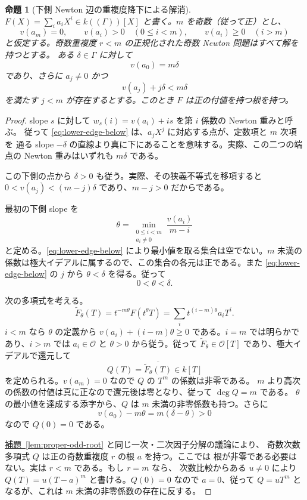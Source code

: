 \documentclass[11pt,uplatex,dvipdfmx]{jsarticle}
\newcommand{\Val}{v}
\newcommand{\Ocal}{\mathcal O}
\newcommand{\namedref}[2]{\hyperref[#2]{#1~\ref*{#2}}}
\theoremstyle{proofnote}
\newtheorem{proposition}[theorem]{命題}
\begin{document}
\begin{proposition}[下側 Newton 辺の重複度降下による解消]
\label{prop:lower-edge}
  \(F(X)=\sum_i a_iX^i\in k((\Gamma))[X]\) と書く。\(m\) を奇数（従って正）とし、
  \[
    \Val(a_m)=0,\qquad
    \Val(a_i)>0\quad(0\le i<m),\qquad
    \Val(a_i)\ge0\quad(i>m)
  \]
  と仮定する。奇数重複度 \(r<m\) の正規化された奇数 Newton 問題はすべて解を持つとする。
  ある \(\delta\in\Gamma\) に対して
  \[
    \Val(a_0)=m\delta
  \]
  であり、さらに \(a_j\ne0\) かつ
  \[
    \Val(a_j)+j\delta<m\delta
    \tag{LE}\label{eq:lower-edge-below}
  \]
  を満たす \(j<m\) が存在するとする。このとき \(F\) は正の付値を持つ根を持つ。
\end{proposition}
\begin{proof}
  slope \(s\) に対して \(w_s(i)=\Val(a_i)+is\) を第 \(i\) 係数の Newton 重みと呼ぶ。
  従って \eqref{eq:lower-edge-below} は、\(a_jX^j\) に対応する点が、定数項と \(m\) 次項を
  通る slope \(-\delta\) の直線より真に下にあることを意味する。実際、この二つの端点の
  Newton 重みはいずれも \(m\delta\) である。

  この下側の点から \(\delta>0\) も従う。実際、その狭義不等式を移項すると
  \(0<\Val(a_j)<(m-j)\delta\) であり、\(m-j>0\) だからである。

  最初の下側 slope を
  \[
    \theta=
    \min_{\substack{0\le i<m\\a_i\ne0}}
       \frac{\Val(a_i)}{m-i}
  \]
  と定める。\eqref{eq:lower-edge-below} により最小値を取る集合は空でない。\(m\) 未満の
  係数は極大イデアルに属するので、この集合の各元は正である。また
  \eqref{eq:lower-edge-below} の \(j\) から \(\theta<\delta\) を得る。従って
  \[
    0<\theta<\delta.
    \tag{S}\label{eq:lower-edge-theta}
  \]

  次の多項式を考える。
  \[
    \widetilde F_\theta(T)=t^{-m\theta}F(t^\theta T)
      =\sum_i t^{(i-m)\theta}a_iT^i.
  \]
  \(i<m\) なら \(\theta\) の定義から
  \(\Val(a_i)+(i-m)\theta\ge0\) である。\(i=m\) では明らかであり、\(i>m\) では
  \(a_i\in\Ocal\) と \(\theta>0\) から従う。従って
  \(\widetilde F_\theta\in\Ocal[T]\) であり、極大イデアルで還元して
  \[
    Q(T)=\overline{\widetilde F_\theta(T)}\in k[T]
  \]
  を定められる。\(\Val(a_m)=0\) なので \(Q\) の \(T^m\) の係数は非零である。
  \(m\) より高次の係数の付値は真に正なので還元後は零となり、従って \(\deg Q=m\) である。
  \(\theta\) の最小値を達成する添字から、\(Q\) は \(m\) 未満の非零係数も持つ。さらに
  \[
    \Val(a_0)-m\theta=m(\delta-\theta)>0
  \]
  なので \(Q(0)=0\) である。

  \namedref{補題}{lem:proper-odd-root} と同じ一次・二次因子分解の議論により、
  奇数次数多項式 \(Q\) は正の奇数重複度 \(r\) の根 \(a\) を持つ。ここでは
  根が非零である必要はない。実は \(r<m\) である。もし \(r=m\) なら、
  次数比較からある \(u\ne0\) により
  \(Q(T)=u(T-a)^m\) と書ける。\(Q(0)=0\) なので \(a=0\)、従って
  \(Q=uT^m\) となるが、これは \(m\) 未満の非零係数の存在に反する。


\end{proof}
\end{document}
